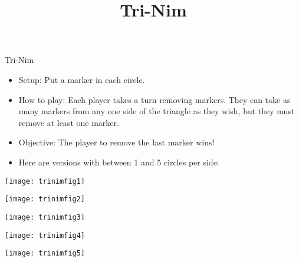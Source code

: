 \documentclass[12pt]{report}
\title{Tri-Nim}
\begin{document}
\thispagestyle{empty}

\begin{center}
  \Huge{Tri-Nim}
\end{center}

\begin{itemize}
\item Setup: Put a marker in each circle.
\item How to play: Each player takes a turn removing markers.  They
  can take as many markers from any one side of the triangle as they
  wish, but they must remove at least one marker.
\item Objective: The player to remove the last marker wins!
\item Here are versions with between 1 and 5 circles per side:
\end{itemize}

\begin{multicols}{2}

  \begin{center}
    \texttt{[image: trinimfig1]}
  \end{center}

  \begin{center}
    \texttt{[image: trinimfig2]}
  \end{center}

  \begin{center}
    \texttt{[image: trinimfig3]}
  \end{center}

  \begin{center}
    \texttt{[image: trinimfig4]}
  \end{center}

  \begin{center}
    \texttt{[image: trinimfig5]}
  \end{center}

\end{multicols}
\end{document}
